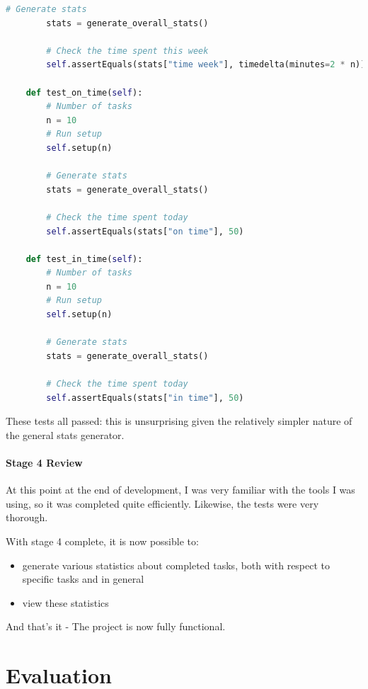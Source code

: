 \documentclass{article}
\begin{document}
\begin{lstlisting}[language=Python]
        # Generate stats
        stats = generate_overall_stats()

        # Check the time spent this week
        self.assertEquals(stats["time week"], timedelta(minutes=2 * n))

    def test_on_time(self):
        # Number of tasks
        n = 10
        # Run setup
        self.setup(n)

        # Generate stats
        stats = generate_overall_stats()

        # Check the time spent today
        self.assertEquals(stats["on time"], 50)

    def test_in_time(self):
        # Number of tasks
        n = 10
        # Run setup
        self.setup(n)

        # Generate stats
        stats = generate_overall_stats()

        # Check the time spent today
        self.assertEquals(stats["in time"], 50)
\end{lstlisting}

These tests all passed:
this is unsurprising given the relatively simpler nature of the general stats generator.

\subsection{Stage 4 Review}
At this point at the end of development,
I was very familiar with the tools I was using,
so it was completed quite efficiently.
Likewise,
the tests were very thorough.

With stage 4 complete, it is now possible to:
\begin{samepage}
	\begin{itemize}
		\item generate various statistics about completed tasks,
		      both with respect to specific tasks and in general
		\item view these statistics
	\end{itemize}
\end{samepage}

And that's it -
The project is now fully functional.

\part{Evaluation}
\end{document}

